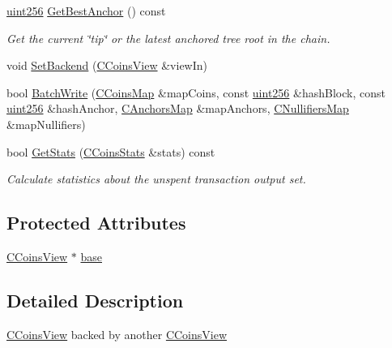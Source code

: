 \begin{DoxyCompactItemize}
\mbox{\hyperlink{classuint256}{uint256}} \mbox{\hyperlink{class_c_coins_view_backed_a2bac0f246916a004e9773f03c37f2c82}{Get\+Best\+Anchor}} () const
\begin{DoxyCompactList}\small\item\em Get the current \char`\"{}tip\char`\"{} or the latest anchored tree root in the chain. \end{DoxyCompactList}\item 
void \mbox{\hyperlink{class_c_coins_view_backed_a7eaddfbfd401a95c2fda2a8d8feaaf73}{Set\+Backend}} (\mbox{\hyperlink{class_c_coins_view}{C\+Coins\+View}} \&view\+In)
\item 
bool \mbox{\hyperlink{class_c_coins_view_backed_ae0f10af7d1cd7706f57628c38426c75c}{Batch\+Write}} (\mbox{\hyperlink{coins_8h_a2886ba2fd0428bae777e1cbcabc02834}{C\+Coins\+Map}} \&map\+Coins, const \mbox{\hyperlink{classuint256}{uint256}} \&hash\+Block, const \mbox{\hyperlink{classuint256}{uint256}} \&hash\+Anchor, \mbox{\hyperlink{coins_8h_a070827cc9d21a91b8f4f4f52a6f7c848}{C\+Anchors\+Map}} \&map\+Anchors, \mbox{\hyperlink{coins_8h_ab651cc287e9594190ef77d2fca2b14c7}{C\+Nullifiers\+Map}} \&map\+Nullifiers)
\item 
bool \mbox{\hyperlink{class_c_coins_view_backed_aa787da5760afa843d32764b70420b2d6}{Get\+Stats}} (\mbox{\hyperlink{struct_c_coins_stats}{C\+Coins\+Stats}} \&stats) const
\begin{DoxyCompactList}\small\item\em Calculate statistics about the unspent transaction output set. \end{DoxyCompactList}\end{DoxyCompactItemize}
\subsection*{Protected Attributes}
\begin{DoxyCompactItemize}
\item 
\mbox{\hyperlink{class_c_coins_view}{C\+Coins\+View}} $\ast$ \mbox{\hyperlink{class_c_coins_view_backed_a901472317114adc4c104efd61dcf6203}{base}}
\end{DoxyCompactItemize}


\subsection{Detailed Description}
\mbox{\hyperlink{class_c_coins_view}{C\+Coins\+View}} backed by another \mbox{\hyperlink{class_c_coins_view}{C\+Coins\+View}} 

